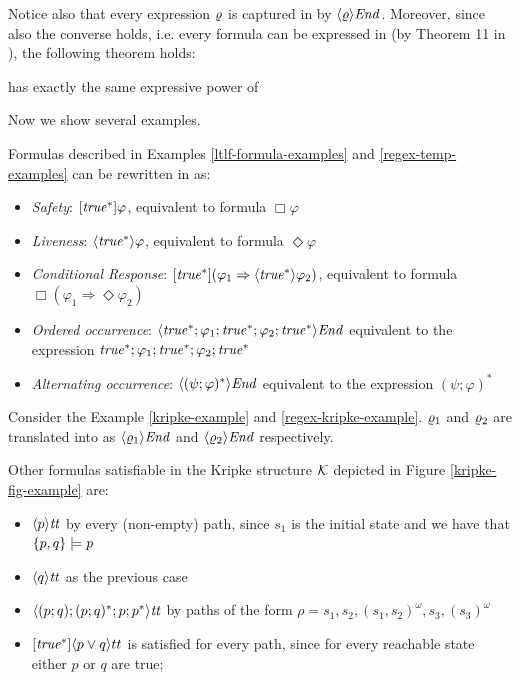 Notice also that every \RE expression $\varrho$ is captured in \LDLf by $\langle \varrho \rangle\mathit{End}$. Moreover, since also the converse holds, i.e. every \LDLf formula can be expressed in \REGEX (by Theorem 11 in \citep{de2013linear}), the following theorem holds:
\begin{theorem} \LDLf has exactly the same expressive power of \MSO
\end{theorem}

Now we show several \LDLf examples.

\begin{example}
	Formulas described in Examples \ref{ltlf-formula-examples} and \ref{regex-temp-examples} can be rewritten in \LDLf as:
	\begin{itemize}
		\item \emph{Safety}: $[\mathit{true}^*]\varphi$, equivalent to \LTLf formula $\Box \varphi$
		\item \emph{Liveness}: $\langle \mathit{true}^* \rangle\varphi$, equivalent to \LTLf formula $\Diamond \varphi$
		\item \emph{Conditional Response}: $[\mathit{true}^*](\varphi_1 \Rightarrow \langle \mathit{true}^* \rangle\varphi_2)$, equivalent to \LTLf formula $\Box (\varphi_1 \Rightarrow \Diamond \varphi_2)$
		\item \emph{Ordered occurrence}: $\langle \mathit{true}^*; \varphi_1; \mathit{true}^*; \varphi_2; \mathit{true}^* \rangle\mathit{End}$ equivalent to the \RE expression  $\mathit{true}^*; \varphi_1; \mathit{true}^*; \varphi_2; \mathit{true}^*$
		\item \emph{Alternating occurrence}: $\langle (\psi; \varphi)^* \rangle\mathit{End}$ equivalent to the \RE expression  $(\psi; \varphi)^*$
	\end{itemize}
\end{example}
\begin{example}
	Consider the Example \ref{kripke-example} and \ref{regex-kripke-example}. $\varrho_1$ and $\varrho_2$  are translated into \LDLf as $\langle \varrho_1 \rangle\mathit{End}$ and $\langle \varrho_2 \rangle\mathit{End}$ respectively.
	
	Other \LDLf formulas satisfiable in the Kripke structure $\mathcal{K}$ depicted in Figure \ref{kripke-fig-example} are:
	\begin{itemize}
	\item $\langle p \rangle{\mathit{tt}}$ by every (non-empty) path, since $s_1$ is the initial state and we have that $\{p, q\}\models p$
	\item $\langle q \rangle{\mathit{tt}}$ as the previous case
	\item $\langle (p;q);(p;q)^*;p;p^* \rangle{\mathit{tt}}$ by paths of the form $\rho = s_1, s_2, (s_1, s_2)^\omega, s_3, (s_3)^\omega$
	\item $[\mathit{true}^*]\langle p\vee q \rangle tt$ is satisfied for every path, since for every reachable state either $p$ or $q$ are true;
	\end{itemize}
\end{example}

